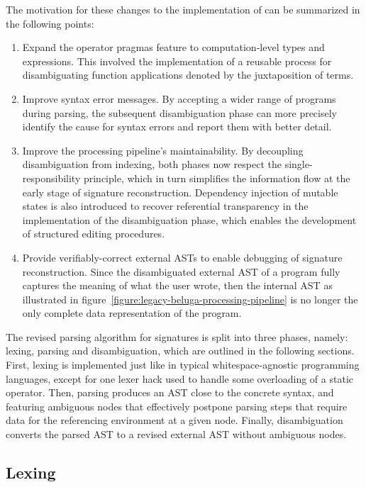 The motivation for these changes to the implementation of \Beluga can be summarized in the following points:
\begin{enumerate}
\item
Expand the operator pragmas feature to computation-level types and expressions.
This involved the implementation of a reusable process for disambiguating function applications denoted by the juxtaposition of terms.
\item
Improve syntax error messages.
By accepting a wider range of programs during parsing, the subsequent disambiguation phase can more precisely identify the cause for syntax errors and report them with better detail.
\item
Improve the processing pipeline's maintainability.
By decoupling disambiguation from indexing, both phases now respect the single-responsibility principle, which in turn simplifies the information flow at the early stage of signature reconstruction.
Dependency injection of mutable states is also introduced to recover referential transparency in the implementation of the disambiguation phase, which enables the development of structured editing procedures.
\item
Provide verifiably-correct external \acp{AST} to enable debugging of signature reconstruction.
Since the disambiguated external \ac{AST} of a program fully captures the meaning of what the user wrote, then the internal \ac{AST} as illustrated in figure~\ref{figure:legacy-beluga-processing-pipeline} is no longer the only complete data representation of the program.
\end{enumerate}

The revised parsing algorithm for \Beluga signatures is split into three phases, namely: lexing, parsing and disambiguation, which are outlined in the following sections.
First, lexing is implemented just like in typical whitespace-agnostic programming languages, except for one lexer hack used to handle some overloading of a static operator.
Then, parsing produces an \ac{AST} close to the concrete syntax, and featuring ambiguous nodes that effectively postpone parsing steps that require data for the referencing environment at a given node.
Finally, disambiguation converts the parsed \ac{AST} to a revised external \ac{AST} without ambiguous nodes.

\subsection{Lexing}

